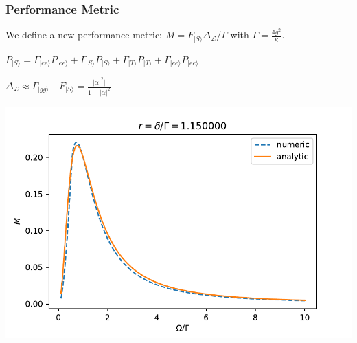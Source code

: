 \documentclass{beamer}
\begin{document}
\begin{frame}
\frametitle{Performance Metric}
We define a new performance metric:
$M = F_{| S \rangle } \Delta_{\mathcal{L}}/\Gamma$ with $\Gamma = \frac{4g^2}{\kappa}$.

\centering

\vspace{3mm}

$  \dot{P}_{|S\rangle} = \Gamma_{|ee\rangle}P_{|ee \rangle} + \Gamma_{|S\rangle} P_{|S\rangle} + \Gamma_{|T\rangle} P_{|T\rangle} + \Gamma_{|ee \rangle} P_{|ee\rangle} $

\vspace{3mm}

$\Delta_\mathcal{L} \approx \Gamma_{|gg\rangle} \quad  F_{|S\rangle }= \frac{|\alpha|^2|}{1 + |\alpha|^2} $

\includegraphics[scale=.5]{Sym_Anal_Num.pdf}
\end{frame}
\end{document}
